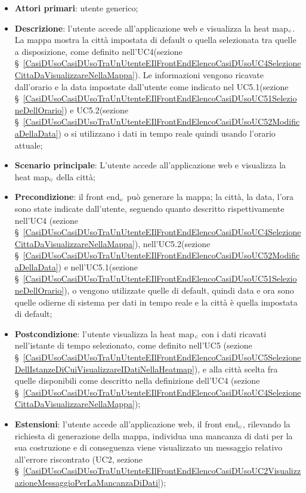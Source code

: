 \begin{itemize}
	\item \textbf{Attori primari}: utente generico;
	\item \textbf{Descrizione}: l’utente accede all’applicazione web e visualizza la heat map$_{\scaleto{G}{3pt}}$. La mappa mostra la città impostata di default o quella selezionata tra quelle a disposizione, come definito nell’UC4(sezione \S~\ref{CasiDUsoCasiDUsoTraUnUtenteEIlFrontEndElencoCasiDUsoUC4SelezioneCittaDaVisualizzareNellaMappa}). Le informazioni vengono ricavate dall’orario e la data impostate dall’utente come indicato nel UC5.1(sezione \S~\ref{CasiDUsoCasiDUsoTraUnUtenteEIlFrontEndElencoCasiDUsoUC51SelezioneDellOrario}) e UC5.2(sezione \S~\ref{CasiDUsoCasiDUsoTraUnUtenteEIlFrontEndElencoCasiDUsoUC52ModificaDellaData}) o si utilizzano i dati in tempo reale quindi usando l’orario attuale;
	\item \textbf{Scenario principale}: L’utente accede all’applicazione web e visualizza la heat map$_{\scaleto{G}{3pt}}$ della città;
	\item \textbf{Precondizione}: il front end$_{\scaleto{G}{3pt}}$ può generare la mappa; la città, la data, l’ora sono state indicate dall’utente, seguendo quanto descritto rispettivamente nell'UC4 (sezione \S~\ref{CasiDUsoCasiDUsoTraUnUtenteEIlFrontEndElencoCasiDUsoUC4SelezioneCittaDaVisualizzareNellaMappa}), nell'UC5.2(sezione \S~\ref{CasiDUsoCasiDUsoTraUnUtenteEIlFrontEndElencoCasiDUsoUC52ModificaDellaData}) e nell'UC5.1(sezione \S~\ref{CasiDUsoCasiDUsoTraUnUtenteEIlFrontEndElencoCasiDUsoUC51SelezioneDellOrario}), o vengono utilizzate quelle di default, quindi data e ora sono quelle odierne di sistema per dati in tempo reale e la città è quella impostata di default;
	\item \textbf{Postcondizione}: l’utente visualizza la heat map$_{\scaleto{G}{3pt}}$ con i dati ricavati nell’istante di tempo selezionato, come definito nell’UC5 (sezione \S~\ref{CasiDUsoCasiDUsoTraUnUtenteEIlFrontEndElencoCasiDUsoUC5SelezioneDellIstanzeDiCuiVisualizzareIDatiNellaHeatmap}), e alla città scelta fra quelle disponibili come descritto nella definizione dell’UC4 (sezione \S~\ref{CasiDUsoCasiDUsoTraUnUtenteEIlFrontEndElencoCasiDUsoUC4SelezioneCittaDaVisualizzareNellaMappa});
	\item \textbf{Estensioni}: l’utente accede all’applicazione web, il front end$_{\scaleto{G}{3pt}}$, rilevando la richiesta di generazione della mappa, individua una mancanza di dati per la sua costruzione e di conseguenza viene visualizzato un messaggio relativo all’errore riscontrato (UC2, sezione \S~\ref{CasiDUsoCasiDUsoTraUnUtenteEIlFrontEndElencoCasiDUsoUC2VisualizzazioneMessaggioPerLaMancanzaDiDati});
\end{itemize}

